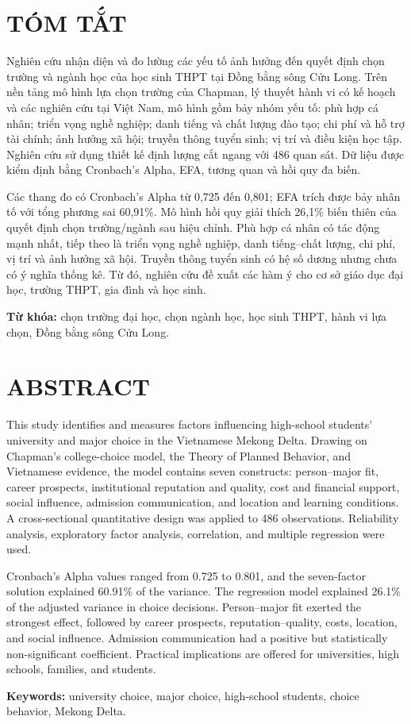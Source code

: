 \chapter*{TÓM TẮT}
Nghiên cứu nhận diện và đo lường các yếu tố ảnh hưởng đến quyết định chọn trường và ngành học của học sinh THPT tại Đồng bằng sông Cửu Long. Trên nền tảng mô hình lựa chọn trường của Chapman, lý thuyết hành vi có kế hoạch và các nghiên cứu tại Việt Nam, mô hình gồm bảy nhóm yếu tố: phù hợp cá nhân; triển vọng nghề nghiệp; danh tiếng và chất lượng đào tạo; chi phí và hỗ trợ tài chính; ảnh hưởng xã hội; truyền thông tuyển sinh; vị trí và điều kiện học tập. Nghiên cứu sử dụng thiết kế định lượng cắt ngang với 486 quan sát. Dữ liệu được kiểm định bằng Cronbach's Alpha, EFA, tương quan và hồi quy đa biến.

Các thang đo có Cronbach's Alpha từ 0,725 đến 0,801; EFA trích được bảy nhân tố với tổng phương sai 60,91\%. Mô hình hồi quy giải thích 26,1\% biến thiên của quyết định chọn trường/ngành sau hiệu chỉnh. Phù hợp cá nhân có tác động mạnh nhất, tiếp theo là triển vọng nghề nghiệp, danh tiếng--chất lượng, chi phí, vị trí và ảnh hưởng xã hội. Truyền thông tuyển sinh có hệ số dương nhưng chưa có ý nghĩa thống kê. Từ đó, nghiên cứu đề xuất các hàm ý cho cơ sở giáo dục đại học, trường THPT, gia đình và học sinh.

\noindent\textbf{Từ khóa:} chọn trường đại học, chọn ngành học, học sinh THPT, hành vi lựa chọn, Đồng bằng sông Cửu Long.

\clearpage\chapter*{ABSTRACT}
This study identifies and measures factors influencing high-school students' university and major choice in the Vietnamese Mekong Delta. Drawing on Chapman's college-choice model, the Theory of Planned Behavior, and Vietnamese evidence, the model contains seven constructs: person--major fit, career prospects, institutional reputation and quality, cost and financial support, social influence, admission communication, and location and learning conditions. A cross-sectional quantitative design was applied to 486 observations. Reliability analysis, exploratory factor analysis, correlation, and multiple regression were used.

Cronbach's Alpha values ranged from 0.725 to 0.801, and the seven-factor solution explained 60.91\% of the variance. The regression model explained 26.1\% of the adjusted variance in choice decisions. Person--major fit exerted the strongest effect, followed by career prospects, reputation--quality, costs, location, and social influence. Admission communication had a positive but statistically non-significant coefficient. Practical implications are offered for universities, high schools, families, and students.

\noindent\textbf{Keywords:} university choice, major choice, high-school students, choice behavior, Mekong Delta.
